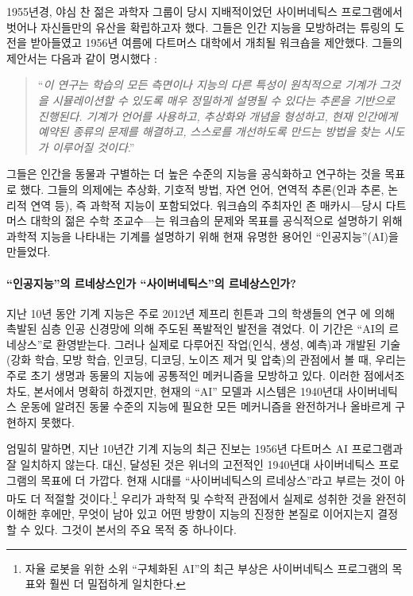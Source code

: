 \documentclass[../../book-main_ko.tex]{subfiles}
\begin{document}
1955년경, 야심 찬 젊은 과학자 그룹이 당시 지배적이었던 사이버네틱스 프로그램에서 벗어나 자신들만의 유산을 확립하고자 했다. 그들은 인간 지능을 모방하려는 튜링의 도전을 받아들였고 1956년 여름에 다트머스 대학에서 개최될 워크숍을 제안했다. 그들의 제안서는 다음과 같이 명시했다 \cite{McCarthy-1955}:
\begin{quote}
    ``\textit{이 연구는 학습의 모든 측면이나 지능의 다른 특성이 원칙적으로 기계가 그것을 시뮬레이션할 수 있도록 매우 정밀하게 설명될 수 있다는 추론을 기반으로 진행된다. 기계가 언어를 사용하고, 추상화와 개념을 형성하고, 현재 인간에게 예약된 종류의 문제를 해결하고, 스스로를 개선하도록 만드는 방법을 찾는 시도가 이루어질 것이다}.''
\end{quote}
그들은 인간을 동물과 구별하는 더 높은 수준의 지능을 공식화하고 연구하는 것을 목표로 했다. 그들의 의제에는 추상화, 기호적 방법, 자연 언어, 연역적 추론(인과 추론, 논리적 연역 등), 즉 과학적 지능이 포함되었다. 워크숍의 주최자인 존 매카시---당시 다트머스 대학의 젊은 수학 조교수---는 워크숍의 문제와 목표를 공식적으로 설명하기 위해 과학적 지능을 나타내는 기계를 설명하기 위해 현재 유명한 용어인 ``인공지능''(AI)을 만들었다.

\paragraph{``인공지능''의 르네상스인가 ``사이버네틱스''의 르네상스인가?}
지난 10년 동안 기계 지능은 주로 2012년 제프리 힌튼과 그의 학생들의 연구 \cite{krizhevsky2012imagenet}에 의해 촉발된 심층 인공 신경망에 의해 주도된 폭발적인 발전을 겪었다. 이 기간은 ``AI의 르네상스''로 환영받는다. 그러나 실제로 다루어진 작업(인식, 생성, 예측)과 개발된 기술(강화 학습, 모방 학습, 인코딩, 디코딩, 노이즈 제거 및 압축)의 관점에서 볼 때, 우리는 주로 초기 생명과 동물의 지능에 공통적인 메커니즘을 모방하고 있다. 이러한 점에서조차도, 본서에서 명확히 하겠지만, 현재의 ``AI'' 모델과 시스템은 1940년대 사이버네틱스 운동에 알려진 동물 수준의 지능에 필요한 모든 메커니즘을 완전하거나 올바르게 구현하지 못했다.

엄밀히 말하면, 지난 10년간 기계 지능의 최근 진보는 1956년 다트머스 AI 프로그램과 잘 일치하지 않는다. 대신, 달성된 것은 위너의 고전적인 1940년대 사이버네틱스 프로그램의 목표에 더 가깝다. 현재 시대를 ``사이버네틱스의 르네상스''라고 부르는 것이 아마도 더 적절할 것이다.\footnote{자율 로봇을 위한 소위 ``구체화된 AI''의 최근 부상은 사이버네틱스 프로그램의 목표와 훨씬 더 밀접하게 일치한다.} 우리가 과학적 및 수학적 관점에서 실제로 성취한 것을 완전히 이해한 후에만, 무엇이 남아 있고 어떤 방향이 지능의 진정한 본질로 이어지는지 결정할 수 있다. 그것이 본서의 주요 목적 중 하나이다.
\end{document}
